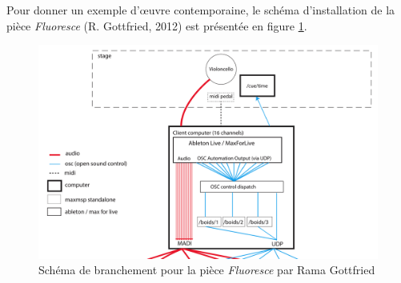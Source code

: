 Pour donner un exemple d'œuvre contemporaine, le schéma d'installation de la pièce \textit{Fluoresce} (R. Gottfried, 2012) est présentée en figure \ref{fig:schemaInstallationFluoresce}.

\begin{figure}[H]
	\centering
	\includegraphics[keepaspectratio=true, width=\textwidth]{Notation/i/schemaInstallationFluoresce.png}
	\caption[Schéma de branchement pour la pièce \textit{Fluoresce} par Rama Gottfried]{Schéma de branchement pour la pièce \textit{Fluoresce} par Rama Gottfried}
	\label{fig:schemaInstallationFluoresce}			
\end{figure}
